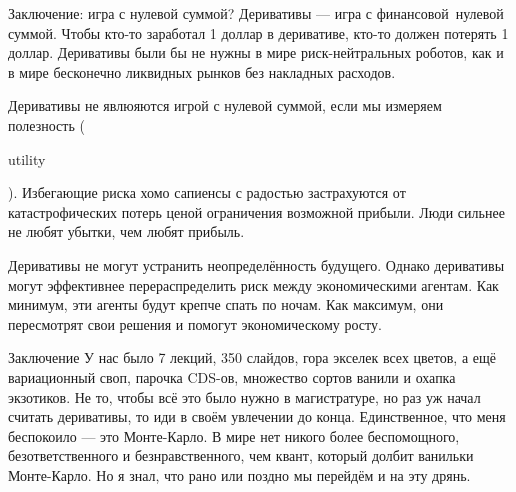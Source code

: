 \documentclass{beamer}
\newcommand{\en}[1]{\begin{otherlanguage}{english}#1\end{otherlanguage}}
\begin{document}
\begin{frame}{Заключение: игра с нулевой суммой?}
\justify
Деривативы --- игра с \alert{финансовой}\ нулевой суммой. Чтобы кто-то заработал 1 доллар в деривативе, кто-то должен потерять 1 доллар. Деривативы были бы не нужны в мире риск-нейтральных роботов, как и в мире бесконечно ликвидных рынков без накладных расходов.

\justify
Деривативы не явлюяются игрой с нулевой суммой, если мы измеряем \alert{полезность} (\en{utility}). Избегающие риска хомо сапиенсы с радостью застрахуются от катастрофических потерь ценой ограничения возможной прибыли. Люди сильнее не любят убытки, чем любят прибыль.

\justify
Деривативы не могут устранить неопределённость будущего. Однако деривативы могут эффективнее перераспределить риск между экономическими агентам. Как минимум, эти агенты будут крепче спать по ночам. Как максимум, они пересмотрят свои решения и помогут экономическому росту.
\end{frame}



\begin{frame}{Заключение}
\justify
У нас было 7 лекций, 350 слайдов, гора экселек всех цветов, а ещё вариационный своп, парочка CDS-ов, множество сортов ванили и охапка экзотиков. Не то, чтобы всё это было нужно в магистратуре, но раз уж начал считать деривативы, то иди в своём увлечении до конца. Единственное, что меня беспокоило --- это Монте-Карло. В мире нет никого более беспомощного, безответственного и безнравственного, чем квант, который долбит ванильки Монте-Карло. Но я знал, что рано или поздно мы перейдём и на эту дрянь.
\end{frame}
\end{document}
